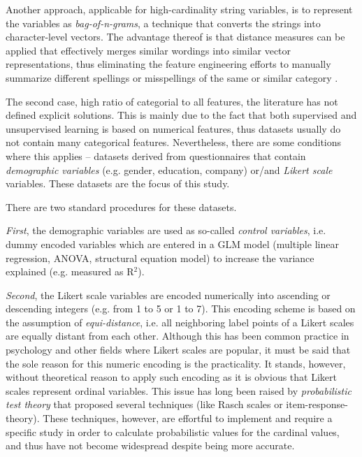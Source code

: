 \documentclass[letterpaper]{article} %
\begin{document}
Another approach, applicable for high-cardinality string variables, is to represent the variables as \textit{bag-of-n-grams}, a technique that converts the strings into character-level vectors. The advantage thereof is that distance measures can be applied that effectively merges similar wordings into similar vector representations, thus eliminating the feature engineering efforts to manually summarize different spellings or misspellings of the same or similar category \cite{Cerda2019}.

The second case, high ratio of categorial to all features, the literature has not defined explicit solutions. This is mainly due to the fact that both supervised and unsupervised learning is based on numerical features, thus datasets usually do not contain many categorical features. Nevertheless, there are some conditions where this applies -- datasets derived from questionnaires that contain \textit{demographic variables} (e.g. gender, education, company) or/and \textit{Likert scale} variables. These datasets are the focus of this study.

There are two standard procedures for these datasets.

\textit{First}, the demographic variables are used as so-called \textit{control variables}, i.e. dummy encoded variables which are entered in a GLM model (multiple linear regression, ANOVA, structural equation model) to increase the variance explained (e.g. measured as R$^2$).

\textit{Second}, the Likert scale variables are encoded numerically into ascending or descending integers (e.g. from 1 to 5 or 1 to 7). This encoding scheme is based on the assumption of \textit{equi-distance}, i.e. all neighboring label points of a Likert scales are equally distant from each other. Although this has been common practice in psychology and other fields where Likert scales are popular, it must be said that the sole reason for this numeric encoding is the practicality. It stands, however, without theoretical reason to apply such encoding as it is obvious that Likert scales represent ordinal variables. This issue has long been raised by \textit{probabilistic test theory} that proposed several techniques (like Rasch scales or item-response-theory). These techniques, however, are effortful to implement and require a specific study in order to calculate probabilistic values for the cardinal values, and thus have not become widespread despite being more accurate.
\end{document}
